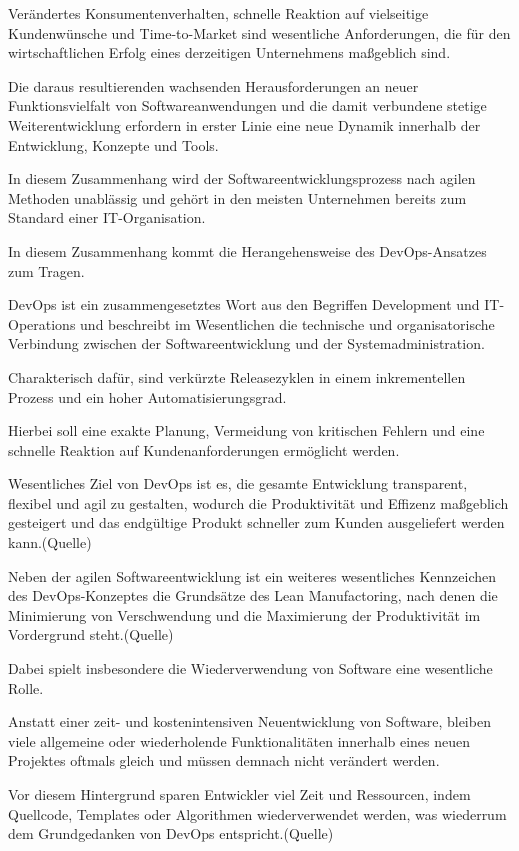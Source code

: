 Verändertes Konsumentenverhalten, schnelle Reaktion auf vielseitige Kundenwünsche und Time-to-Market sind wesentliche Anforderungen, die für den wirtschaftlichen Erfolg eines derzeitigen Unternehmens maßgeblich sind.

Die daraus resultierenden wachsenden Herausforderungen an neuer Funktionsvielfalt von Softwareanwendungen und die damit verbundene stetige Weiterentwicklung erfordern in erster Linie eine neue Dynamik innerhalb der Entwicklung, Konzepte und Tools. 

In diesem Zusammenhang wird der Softwareentwicklungsprozess nach agilen Methoden unablässig und gehört in den meisten Unternehmen bereits zum Standard einer IT-Organisation. 

In diesem Zusammenhang kommt die Herangehensweise des DevOps-Ansatzes zum Tragen.

DevOps ist ein zusammengesetztes Wort aus den Begriffen Development und IT-Operations und beschreibt im Wesentlichen die technische und organisatorische Verbindung zwischen der Softwareentwicklung und der Systemadministration. \cite[S. 3]{santos_attraction_2013}

Charakterisch dafür, sind verkürzte Releasezyklen in einem inkrementellen Prozess und ein hoher Automatisierungsgrad. 

Hierbei soll eine exakte Planung, Vermeidung von kritischen Fehlern und eine schnelle Reaktion auf Kundenanforderungen ermöglicht werden.

Wesentliches Ziel von DevOps ist es, die gesamte Entwicklung transparent, flexibel und agil zu gestalten, wodurch die Produktivität und Effizenz maßgeblich gesteigert und das endgültige Produkt schneller zum Kunden ausgeliefert werden kann.(Quelle)  

Neben der agilen Softwareentwicklung ist ein weiteres wesentliches Kennzeichen des DevOps-Konzeptes die Grundsätze des Lean Manufactoring, nach denen die Minimierung von Verschwendung und die Maximierung der Produktivität im Vordergrund steht.(Quelle) 

Dabei spielt insbesondere die Wiederverwendung von Software eine wesentliche Rolle.

Anstatt einer zeit- und kostenintensiven Neuentwicklung von Software, bleiben viele allgemeine oder wiederholende Funktionalitäten innerhalb eines neuen Projektes oftmals gleich und müssen demnach nicht verändert werden.

Vor diesem Hintergrund sparen Entwickler viel Zeit und Ressourcen, indem Quellcode, Templates oder Algorithmen wiederverwendet werden, was wiederrum dem Grundgedanken von DevOps entspricht.(Quelle) 

